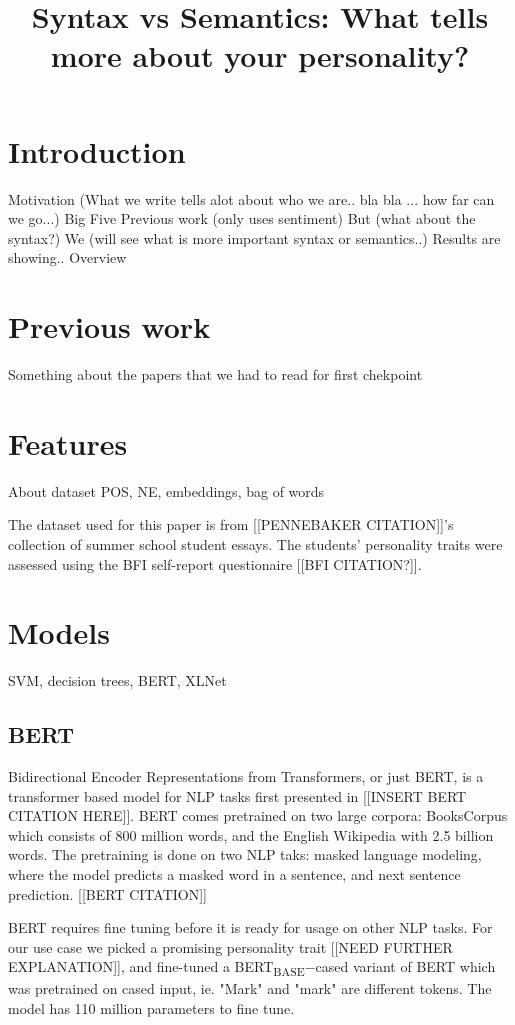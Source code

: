 \documentclass[10pt, a4paper]{article}
\title{Syntax vs Semantics: What tells more about your personality?}
\begin{document}
\maketitleabstract

\section{Introduction}
Motivation (What we write tells alot about who we are.. bla bla ... how far can we go...)
Big Five
Previous work (only uses sentiment)
But (what about the syntax?)
We (will see what is more important syntax or semantics..)
Results are showing..
Overview

\section{Previous work}
Something about the papers that we had to read for first chekpoint

\section{Features}
About dataset
POS, NE, embeddings, bag of words

The dataset used for this paper is from [[PENNEBAKER CITATION]]'s collection of summer school student essays. The students' personality traits were assessed using the BFI self-report questionaire [[BFI CITATION?]].

\section{Models}
SVM, decision trees, BERT, XLNet

\subsection{BERT}

Bidirectional Encoder Representations from Transformers, or just BERT, is a transformer based model for NLP tasks first presented in [[INSERT BERT CITATION HERE]]. BERT comes pretrained on two large corpora: BooksCorpus which consists of 800 million words, and the English Wikipedia with 2.5 billion words. The pretraining is done on two NLP taks: masked language modeling, where the model predicts a masked word in a sentence, and next sentence prediction. [[BERT CITATION]]

BERT requires fine tuning before it is ready for usage on other NLP tasks. For our use case we picked a promising personality trait [[NEED FURTHER EXPLANATION]], and fine-tuned a BERT\textsubscript{BASE}$-$cased variant of BERT which was pretrained on cased input, ie. "Mark" and "mark" are different tokens. The model has 110 million parameters to fine tune.
\end{document}

